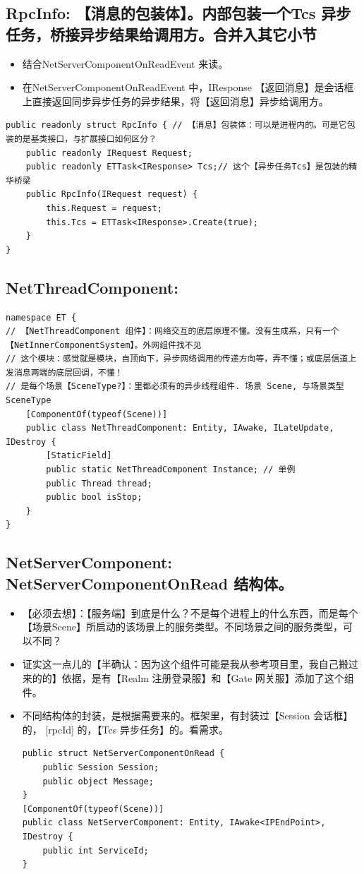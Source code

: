 \documentclass[9pt, b5paper]{article}
\begin{document}
\subsection{RpcInfo: 【消息的包装体】。内部包装一个Tcs 异步任务，桥接异步结果给调用方。合并入其它小节}
\label{sec-3-1}
\begin{itemize}
\item 结合NetServerComponentOnReadEvent 来读。
\item 在NetServerComponentOnReadEvent 中，IResponse 【返回消息】是会话框上直接返回同步异步任务的异步结果，将【返回消息】异步给调用方。
\end{itemize}
\begin{verbatim}
public readonly struct RpcInfo { // 【消息】包装体：可以是进程内的。可是它包装的是基类接口，与扩展接口如何区分？
    public readonly IRequest Request;
    public readonly ETTask<IResponse> Tcs;// 这个【异步任务Tcs】是包装的精华桥梁
    public RpcInfo(IRequest request) {
        this.Request = request;
        this.Tcs = ETTask<IResponse>.Create(true);
    }
}
\end{verbatim}
\subsection{NetThreadComponent:}
\label{sec-3-2}
\begin{verbatim}
namespace ET {
// 【NetThreadComponent 组件】：网络交互的底层原理不懂。没有生成系，只有一个【NetInnerComponentSystem】。外网组件找不见
// 这个模块：感觉就是模块，自顶向下，异步网络调用的传递方向等，弄不懂；或底层信道上发消息两端的底层回调，不懂！
// 是每个场景【SceneType?】：里都必须有的异步线程组件. 场景 Scene, 与场景类型SceneType
    [ComponentOf(typeof(Scene))] 
    public class NetThreadComponent: Entity, IAwake, ILateUpdate, IDestroy {
        [StaticField]
        public static NetThreadComponent Instance; // 单例
        public Thread thread;
        public bool isStop;
    }
}
\end{verbatim}
\subsection{NetServerComponent: NetServerComponentOnRead 结构体。}
\label{sec-3-3}
\begin{itemize}
\item 【必须去想】：【服务端】到底是什么？不是每个进程上的什么东西，而是每个【场景Scene】所启动的该场景上的服务类型。不同场景之间的服务类型，可以不同？
\item 证实这一点儿的【半确认：因为这个组件可能是我从参考项目里，我自己搬过来的的】依据，是有【Realm 注册登录服】和【Gate 网关服】添加了这个组件。
\item 不同结构体的封装，是根据需要来的。框架里，有封装过【Session 会话框】的， [rpcId] 的，【Tcs 异步任务】的。看需求。 
\begin{verbatim}
public struct NetServerComponentOnRead {
    public Session Session;
    public object Message;
}
[ComponentOf(typeof(Scene))]
public class NetServerComponent: Entity, IAwake<IPEndPoint>, IDestroy {
    public int ServiceId;
}
\end{verbatim}
\end{itemize}
\end{document}
